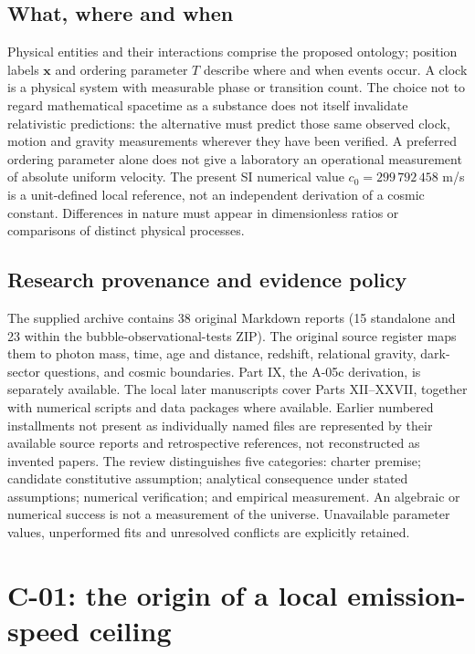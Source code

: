 \documentclass[
  11pt,
  twoside]{article}
\begin{document}
\subsection{What, where and when}\label{what-where-and-when}

Physical entities and their interactions comprise the proposed ontology;
position labels \(\mathbf{x}\) and ordering parameter \(T\) describe
where and when events occur. A clock is a physical system with
measurable phase or transition count. The choice not to regard
mathematical spacetime as a substance does not itself invalidate
relativistic predictions: the alternative must predict those same
observed clock, motion and gravity measurements wherever they have been
verified. A preferred ordering parameter alone does not give a
laboratory an operational measurement of absolute uniform velocity. The
present SI numerical value \(c_0=299\,792\,458\) m/s is a unit-defined
local reference, not an independent derivation of a cosmic constant.
Differences in nature must appear in dimensionless ratios or comparisons
of distinct physical processes.

\subsection{Research provenance and evidence
policy}\label{research-provenance-and-evidence-policy}

The supplied archive contains 38 original Markdown reports (15
standalone and 23 within the bubble-observational-tests ZIP). The
original source register maps them to photon mass, time, age and
distance, redshift, relational gravity, dark-sector questions, and
cosmic boundaries. Part IX, the A-05c derivation, is separately
available. The local later manuscripts cover Parts XII--XXVII, together
with numerical scripts and data packages where available. Earlier
numbered installments not present as individually named files are
represented by their available source reports and retrospective
references, not reconstructed as invented papers. The review
distinguishes five categories: charter premise; candidate constitutive
assumption; analytical consequence under stated assumptions; numerical
verification; and empirical measurement. An algebraic or numerical
success is not a measurement of the universe. Unavailable parameter
values, unperformed fits and unresolved conflicts are explicitly
retained.

\section{C-01: the origin of a local emission-speed
ceiling}\label{c-01-the-origin-of-a-local-emission-speed-ceiling}
\end{document}
